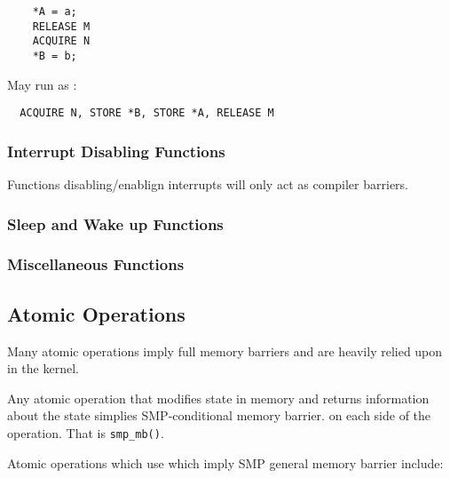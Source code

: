 \documentclass{article}
\begin{document}
\begin{lstlisting}  
	*A = a;
	RELEASE M
	ACQUIRE N
	*B = b;
\end{lstlisting}

May run as :


\begin{lstlisting}
  ACQUIRE N, STORE *B, STORE *A, RELEASE M
\end{lstlisting}



\subsubsection{Interrupt Disabling Functions}

Functions disabling/enablign interrupts will only act as compiler
barriers. 

\subsubsection{Sleep and Wake up Functions}



\subsubsection{Miscellaneous Functions}



\subsection{Atomic Operations}

Many atomic operations imply full memory barriers and are heavily
relied upon in the kernel.

Any atomic operation that modifies state in memory and returns
information about the state simplies SMP-conditional memory barrier.
on each side of the operation. That is \lstinline{smp_mb()}.

Atomic operations which use which imply SMP general memory barrier
include:
\end{document}
